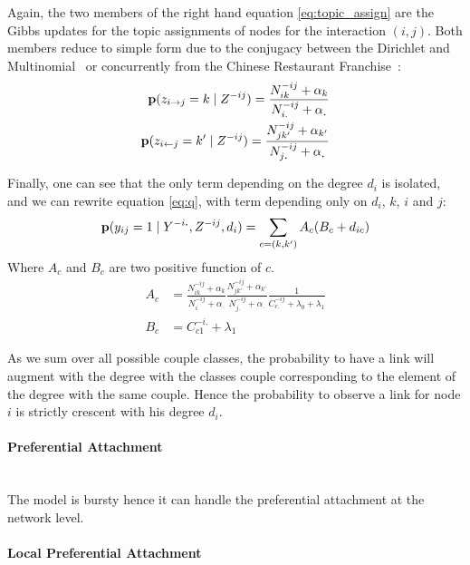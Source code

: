Again, the two members of the right hand equation \eqref{eq:topic_assign} are the Gibbs updates for the topic assignments of nodes for the interaction $(i,j)$. Both members reduce to simple form due to the conjugacy between the Dirichlet and Multinomial~\cite{DM} or concurrently from the Chinese Restaurant Franchise~\cite{HDP}:
\begin{align}
\mathbf{p}(z_{i\rightarrow j}=k \mid Z^{-ij}) = \frac{N_{ik}^{-ij} + \alpha_k}{ N_{i.}^{-ij} + \alpha_{\bm{.}} } \\
\mathbf{p}(z_{i\leftarrow j}=k' \mid Z^{-ij}) = \frac{N_{jk'}^{-ij} + \alpha_{k'}}{ N_{j\bm{.}}^{-ij} + \alpha_{\bm{.}} } 
\end{align}

Finally, one can see that the only term depending on the degree $d_i$ is isolated, and we can rewrite equation \eqref{eq:q}, with term depending only on $d_i$, $k$, $i$ and $j$:
\begin{equation}
\mathbf{p}(y_{ij}=1 \mid Y^{-i\bm{.}}, Z^{-ij}, d_i ) = \sum_{c=(k, k')} A_c (B_c + d_{ic})
\end{equation}
Where $A_c$ and $B_c$ are two positive function of $c$.
\begin{align}
A_c &= \frac{N_{ik}^{-ij} + \alpha_k}{ N_{i.}^{-ij} + \alpha_{\bm{.}} } \frac{N_{jk'}^{-ij} + \alpha_{k'}}{ N_{j\bm{.}}^{-ij} + \alpha_{\bm{.}} } \frac{1}{C_{c\bm{.}}^{-ij} + \lambda_0+\lambda_1} \\
B_c &= C_{c1}^{-i.} + \lambda_1
\end{align}

As we sum over all possible couple classes, the probability to have a link will augment with the degree with the classes couple corresponding to the element of the degree with the same couple. Hence the probability to observe a link for node $i$ is strictly crescent with his degree $d_i$. 

\paragraph{Preferential Attachment}~\\

The model is bursty hence it can handle the preferential attachment at the network level.

\paragraph{Local Preferential Attachment}~\\


